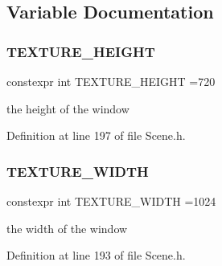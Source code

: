 \subsection{Variable Documentation}
\mbox{\label{_scene_8h_adc64a996fed3c125c1e9f6c055ce644f}} 
\subsubsection{TEXTURE\_HEIGHT}
{\footnotesize\ttfamily constexpr int T\+E\+X\+T\+U\+R\+E\+\_\+\+H\+E\+I\+G\+HT =720\hspace{0.3cm}{\ttfamily [constexpr]}}



the height of the window 



Definition at line 197 of file Scene.\+h.

\mbox{\label{_scene_8h_a795c922bb6141b030644592fcffa850b}} 
\subsubsection{TEXTURE\_WIDTH}
{\footnotesize\ttfamily constexpr int T\+E\+X\+T\+U\+R\+E\+\_\+\+W\+I\+D\+TH =1024\hspace{0.3cm}{\ttfamily [constexpr]}}



the width of the window 



Definition at line 193 of file Scene.\+h.


